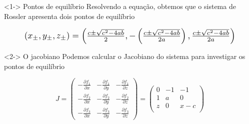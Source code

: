 \documentclass{beamer}
\begin{document}
\begin{frame}
	\begin{exampleblock}
		<1-> {Pontos de equilíbrio} 
		Resolvendo a equação, obtemos que o sistema de Rossler apresenta dois pontos de equilíbrio

		\noindent
		\begin{equation}
			\resizebox{0.9 \hsize}{!}{
			$(x_{\pm}, y_{\pm}, z_{\pm})	=
			\left( \frac{c\pm\sqrt{c^2-4ab}}{2},
			-\left(\frac{c\pm\sqrt{c^2-4ab}}{2a}\right),
			\frac{c\pm\sqrt{c^2-4ab}}{2a}\right)$
		}
		\label{eq:equilibrium}
		\end{equation}
		
	\end{exampleblock}

	\begin{exampleblock}
		<2-> {O jacobiano } 
		Podemos calcular o Jacobiano do sistema para investigar os pontos de equilíbrio

		\begin{equation}
J = \begin{pmatrix}
-\frac{\partial f_1}{\partial x} & -\frac{\partial f_1}{\partial y} & -\frac{\partial f_1}{\partial z} \\
-\frac{\partial f_2}{\partial x} & -\frac{\partial f_2}{\partial y} & -\frac{\partial f_2}{\partial z} \\
-\frac{\partial f_3}{\partial x} & -\frac{\partial f_3}{\partial y} & -\frac{\partial f_3}{\partial z}
\end{pmatrix} = 
\begin{pmatrix}0 & -1 & -1 \\ 1 & a & 0 \\ z & 0 & x-c\\\end{pmatrix}
		\label{jacobian}
		\end{equation}
		
	\end{exampleblock}
\end{frame}

\end{document}
